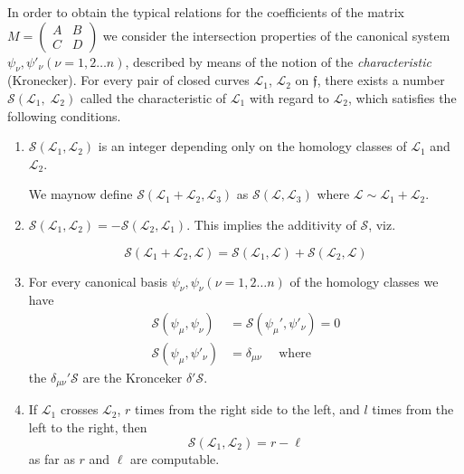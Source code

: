 In order to obtain the typical relations for the coefficients of the
matrix $M= \begin{pmatrix} A & B \\ C & D  \end{pmatrix}$ we consider
the intersection properties of the canonical system $\psi_\nu,
\psi'_\nu    (\nu = 1,2 \ldots n)$, described by means of the
notion of the \textit{ characteristic } (Kronecker). For every pair of
closed curves $\mathscr{L}_1$, $\mathscr{L}_2$ on $\mathfrak{f}$, there
exists a number $\mathscr{S}(\mathscr{L}_1, \; \mathscr{L}_2)$ called the
characteristic of $\mathscr{L}_1$ with regard to $\mathscr{L}_2$,
which satisfies the following conditions. 
\begin{enumerate}[1)]
\item $\mathscr{S}(\mathscr{L}_1,\mathscr{L}_2)$ is an integer
  depending only on the homology classes of $\mathscr{L}_1$ and
  $\mathscr{L}_2$. 

We may\pageoriginale now define $\mathscr{S}(\mathscr{L}_1 + \mathscr{L}_2,
\mathscr{L}_3)$  as $\mathscr{S}(\mathscr{L},\mathscr{L}_3)$ where
$\mathscr{L}   \sim   \mathscr{L}_1 + \mathscr{L}_2$. 

\item $\mathscr{S}(\mathscr{L}_1, \mathscr{L}_2) = -
  \mathscr{S}(\mathscr{L}_2,\mathscr{L}_1)$. This implies the
  additivity of $\mathscr{S}$, viz. 

\begin{equation*}
\mathscr{S}(\mathscr{L}_1 + \mathscr{L}_2, \mathscr{L}) =
\mathscr{S}(\mathscr{L}_1,\mathscr{L}) +
\mathscr{S}(\mathscr{L}_2,\mathscr{L})\tag{3}\label{eq3} 
\end{equation*}

\item For every canonical basis $\psi_\nu, \psi_\nu
  (\nu = 1,2 \ldots n)$ of the homology classes we have 
\begin{align*}
\mathscr{S}(\psi_\mu , \psi_\nu ) &  =
\mathscr{S}(\psi_\mu' ,\psi'_{\nu}) = 0\\ 
\mathscr{S}(\psi_\mu, \psi'_\nu) &  = \delta_{\mu \nu}
\quad \text{ where } \tag{4}\label{eq4} 
\end{align*}
the $\delta_{\mu \nu}'\mathscr{S}$ are the Kronceker $\delta'
\mathscr{S}$. 

\item If $\mathscr{L}_1$ crosses $\mathscr{L}_2$, $r$ times from the
  right side to the left, and $l$ times from the left to the right,
  then  
\begin{equation*}
\mathscr{S} (\mathscr{L}_1, \mathscr{L}_2) = r -\ell \tag{5}\label{eq5}
\end{equation*}
as far as $r$ and $\ell$ are computable.
\end{enumerate}

